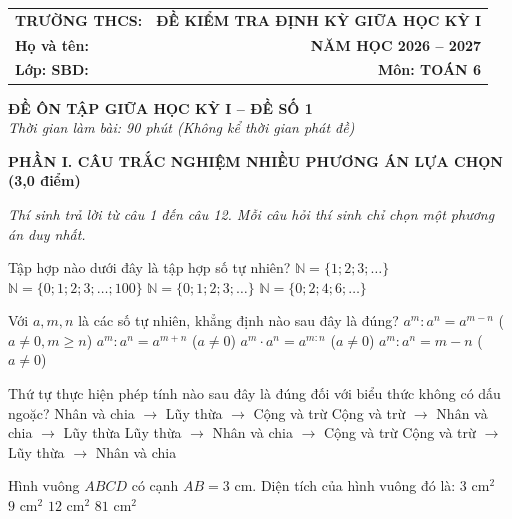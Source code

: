 \documentclass[12pt,a4paper]{article}
\begin{document}
\noindent
\begin{tabularx}{\linewidth}{X r}
\textbf{TRƯỜNG THCS: \dotfill} & \textbf{ĐỀ KIỂM TRA ĐỊNH KỲ GIỮA HỌC KỲ I} \\
\textbf{Họ và tên: \dotfill} & \textbf{NĂM HỌC 2026 -- 2027} \\
\textbf{Lớp: \dotfill \quad SBD: \dotfill} & \textbf{Môn: TOÁN 6} \\
\hline
\end{tabularx}
\vspace{2mm}

\begin{center}
  \textbf{\large ĐỀ ÔN TẬP GIỮA HỌC KỲ I -- ĐỀ SỐ 1}\\
  \textit{Thời gian làm bài: 90 phút (Không kể thời gian phát đề)}
\end{center}
\vspace{1mm}

\noindent\textbf{\large PHẦN I. CÂU TRẮC NGHIỆM NHIỀU PHƯƠNG ÁN LỰA CHỌN (3,0 điểm)}

\textit{Thí sinh trả lời từ câu 1 đến câu 12. Mỗi câu hỏi thí sinh chỉ chọn một phương án duy nhất.}

\vspace{1mm}
\begin{ex}
Tập hợp nào dưới đây là tập hợp số tự nhiên?
\choice
{$\mathbb{N} = \{1; 2; 3; \dots\}$}
{$\mathbb{N} = \{0; 1; 2; 3; \dots; 100\}$}
{\True $\mathbb{N} = \{0; 1; 2; 3; \dots\}$}
{$\mathbb{N} = \{0; 2; 4; 6; \dots\}$}
\end{ex}

\begin{ex}
Với $a, m, n$ là các số tự nhiên, khẳng định nào sau đây là đúng?
\choice
{\True $a^m : a^n = a^{m-n}$ ($a \neq 0, m \geq n$)}
{$a^m : a^n = a^{m+n}$ ($a \neq 0$)}
{$a^m \cdot a^n = a^{m:n}$ ($a \neq 0$)}
{$a^m : a^n = m - n$ ($a \neq 0$)}
\end{ex}

\begin{ex}
Thứ tự thực hiện phép tính nào sau đây là đúng đối với biểu thức không có dấu ngoặc?
\choice
{Nhân và chia $\to$ Lũy thừa $\to$ Cộng và trừ}
{Cộng và trừ $\to$ Nhân và chia $\to$ Lũy thừa}
{\True Lũy thừa $\to$ Nhân và chia $\to$ Cộng và trừ}
{Cộng và trừ $\to$ Lũy thừa $\to$ Nhân và chia}
\end{ex}

\begin{ex}
Hình vuông $ABCD$ có cạnh $AB = 3\text{ cm}$. Diện tích của hình vuông đó là:
\choice
{$3\text{ cm}^2$}
{\True $9\text{ cm}^2$}
{$12\text{ cm}^2$}
{$81\text{ cm}^2$}
\end{ex}
\end{document}
